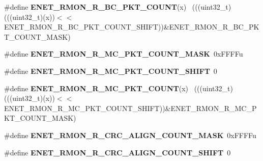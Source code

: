 \begin{DoxyCompactItemize}
\item 
\hypertarget{group___e_n_e_t___register___masks_gab4548f5315d02d4c45879d1d626dda13}{}\#define {\bfseries E\+N\+E\+T\+\_\+\+R\+M\+O\+N\+\_\+\+R\+\_\+\+B\+C\+\_\+\+P\+K\+T\+\_\+\+C\+O\+U\+N\+T}(x)                        ~(((uint32\+\_\+t)(((uint32\+\_\+t)(x))$<$$<$E\+N\+E\+T\+\_\+\+R\+M\+O\+N\+\_\+\+R\+\_\+\+B\+C\+\_\+\+P\+K\+T\+\_\+\+C\+O\+U\+N\+T\+\_\+\+S\+H\+I\+F\+T))\&E\+N\+E\+T\+\_\+\+R\+M\+O\+N\+\_\+\+R\+\_\+\+B\+C\+\_\+\+P\+K\+T\+\_\+\+C\+O\+U\+N\+T\+\_\+\+M\+A\+S\+K)\label{group___e_n_e_t___register___masks_gab4548f5315d02d4c45879d1d626dda13}

\item 
\hypertarget{group___e_n_e_t___register___masks_gaffc93969b103038343e11847c1dd49f0}{}\#define {\bfseries E\+N\+E\+T\+\_\+\+R\+M\+O\+N\+\_\+\+R\+\_\+\+M\+C\+\_\+\+P\+K\+T\+\_\+\+C\+O\+U\+N\+T\+\_\+\+M\+A\+S\+K}~0x\+F\+F\+F\+Fu\label{group___e_n_e_t___register___masks_gaffc93969b103038343e11847c1dd49f0}

\item 
\hypertarget{group___e_n_e_t___register___masks_ga2bd574ecd5d63b6c391f9db9c33a22f6}{}\#define {\bfseries E\+N\+E\+T\+\_\+\+R\+M\+O\+N\+\_\+\+R\+\_\+\+M\+C\+\_\+\+P\+K\+T\+\_\+\+C\+O\+U\+N\+T\+\_\+\+S\+H\+I\+F\+T}~0\label{group___e_n_e_t___register___masks_ga2bd574ecd5d63b6c391f9db9c33a22f6}

\item 
\hypertarget{group___e_n_e_t___register___masks_ga8bff479154de292b89929a5459f27c6f}{}\#define {\bfseries E\+N\+E\+T\+\_\+\+R\+M\+O\+N\+\_\+\+R\+\_\+\+M\+C\+\_\+\+P\+K\+T\+\_\+\+C\+O\+U\+N\+T}(x)                        ~(((uint32\+\_\+t)(((uint32\+\_\+t)(x))$<$$<$E\+N\+E\+T\+\_\+\+R\+M\+O\+N\+\_\+\+R\+\_\+\+M\+C\+\_\+\+P\+K\+T\+\_\+\+C\+O\+U\+N\+T\+\_\+\+S\+H\+I\+F\+T))\&E\+N\+E\+T\+\_\+\+R\+M\+O\+N\+\_\+\+R\+\_\+\+M\+C\+\_\+\+P\+K\+T\+\_\+\+C\+O\+U\+N\+T\+\_\+\+M\+A\+S\+K)\label{group___e_n_e_t___register___masks_ga8bff479154de292b89929a5459f27c6f}

\item 
\hypertarget{group___e_n_e_t___register___masks_ga281a3f038fe24ee481f4b620968e402f}{}\#define {\bfseries E\+N\+E\+T\+\_\+\+R\+M\+O\+N\+\_\+\+R\+\_\+\+C\+R\+C\+\_\+\+A\+L\+I\+G\+N\+\_\+\+C\+O\+U\+N\+T\+\_\+\+M\+A\+S\+K}~0x\+F\+F\+F\+Fu\label{group___e_n_e_t___register___masks_ga281a3f038fe24ee481f4b620968e402f}

\item 
\hypertarget{group___e_n_e_t___register___masks_gade379ca6709a28dd3014b9c0062145de}{}\#define {\bfseries E\+N\+E\+T\+\_\+\+R\+M\+O\+N\+\_\+\+R\+\_\+\+C\+R\+C\+\_\+\+A\+L\+I\+G\+N\+\_\+\+C\+O\+U\+N\+T\+\_\+\+S\+H\+I\+F\+T}~0\label{group___e_n_e_t___register___masks_gade379ca6709a28dd3014b9c0062145de}


\end{DoxyCompactItemize}
